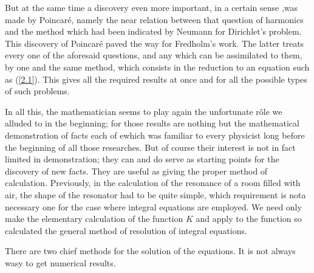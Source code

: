 \documentclass[12pt,oneside]{book}
\begin{document}
But at the same time a discovery even more important, in a certain sense ,was made by Poincar\'e, namely the near relation between that question of harmonics and the method which had been indicated by Neumann for Dirichlet's problem. This discovery of Poincar\'e paved the way for Fredholm's work. The latter treats every one of the aforesaid questions, and any which can be assimilated to them, by one and the same method, which consists in the reduction to an equation such as (\ref{2.1}). This gives all the required results at once and for all the possible types of such problems. \par 

In all this, the mathematician seems to play again the unfortunate r\^ole we alluded to in the beginning; for those results are nothing but the mathematical demonstration of facts each of ewhich was familiar to every physicist long before the beginning of all those researches. But of course their interest is not in fact limited in demonstration; they can and do serve as starting points for the discovery of new facts. They are useful as giving the proper method of calculation. Previously, in the calculation of the resonance of a room filled with air, the shape of the resonator had to be quite simple, which requirement is nota necessary one for the case where integral equations are employed. We need only make the elementary calculation of the function $K$ and apply to the function so calculated the general method of resolution of integral equations. \par 

There are two chief methods for the solution of the equations. It is not always wasy to get numerical results. \par 
\end{document}
